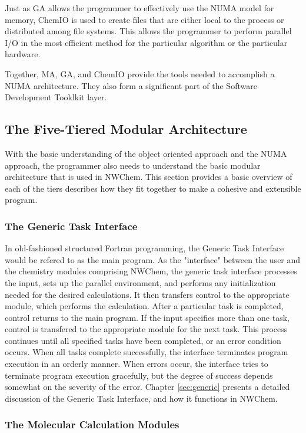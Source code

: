 Just as GA allows the programmer to effectively use the NUMA model for
memory, ChemIO is used to create files that are either local to the
process or
distributed among file systems.  This allows the programmer to perform
parallel I/O in the most efficient method for the particular
algorithm or the particular hardware.

Together, MA, GA, and ChemIO provide the tools needed to accomplish a
NUMA architecture.  They also form a significant part of the Software
Development Tooklkit layer.

\subsection{The Five-Tiered Modular Architecture}

With the basic understanding of the object oriented approach and the
NUMA approach, the programmer also needs to understand the basic
modular architecture that is used in NWChem.  This section provides a
basic overview of each of the tiers describes how 
they fit together to make a cohesive and extensible program.

\subsubsection{The Generic Task Interface}

In old-fashioned structured Fortran programming, the Generic Task
Interface would be refered to as the main program.  As the "interface"
between the user and the chemistry modules comprising NWChem, the
generic task interface processes the input, sets up the parallel 
environment, and performs any initialization needed for the
desired calculations.  It then transfers control to the appropriate
module, which performs the calculation.  After a particular task is
completed, control returns to the main program.
If the input specifies more than one task, 
control is transfered to the appropriate module for the next task.  This
process continues until all specified tasks have been completed, or
an error condition occurs.  When all tasks complete successfully, the
interface terminates program execution in an orderly manner.  When errors
occur, the interface tries to terminate program execution gracefully,
but the degree of success depends somewhat on the severity
of the error.  Chapter \ref{sec:generic} presents a detailed discussion
of the Generic Task Interface, and how it functions in NWChem.

\subsubsection{The Molecular Calculation Modules}

